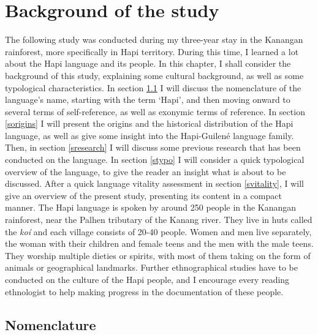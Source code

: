 \documentclass[a4paper, 12pt, oneside]{memoir}
\newcommand{\family}{Hapi-Guilené }
\newcommand{\peoplef}{Hapi }
\newcommand{\emh}[1]{\textit{#1}}
\begin{document}
\chapter{Background of the study}
The following study was conducted during my three-year stay in the Kanangan rainforest, more specifically in Hapi territory. During this time, I learned a lot about the Hapi language and its people. In this chapter, I shall consider the background of this study, explaining some cultural background, as well as some typological characteristics. In section \ref{snmc} I will discuss the nomenclature of the language's name, starting with the term `Hapi', and then moving onward to several terms of self-reference, as well as exonymic terms of reference. In section \ref{sorigins} I will present the origins and the historical distribution of the Hapi language, as well as give some insight into the \family language family. Then, in section \ref{sresearch} I will discuss some previous research that has been conducted on the language. In section \ref{stypo} I will consider a quick typological overview of the language, to give the reader an insight what is about to be discussed. After a quick language vitality assessment in section \ref{svitality}, I will give an overview of the present study, presenting its content in a compact manner.
The Hapi language is spoken by around 250 people in the Kanangan rainforest, near the Palhen tributary of the Kanang river. They live in huts called the \emh{koí} and each village consists of 20-40 people. Women and men live separately, the woman with their children and female teens and the men with the male teens. They worship multiple dieties or spirits, with most of them taking on the form of animals or geographical landmarks. Further ethnographical studies have to be conducted on the culture of the \peoplef people, and I encourage every reading ethnologist to help making progress in the documentation of these people. 

\section{Nomenclature}\label{snmc}
\end{document}
